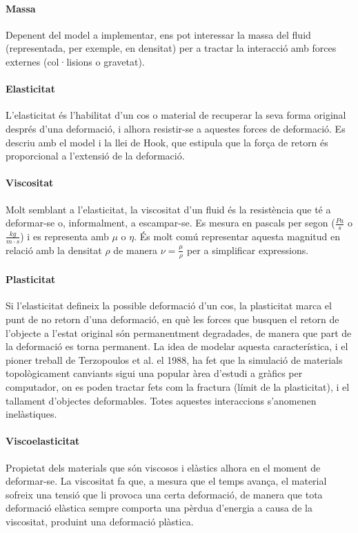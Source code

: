 \documentclass[a4paper]{article} %
\begin{document}
	\paragraph{\quad Massa} Depenent del model a implementar, ens pot interessar la massa del fluid (representada, per exemple, en densitat) per a tractar la interacció amb forces externes (col·lisions o gravetat).
	\paragraph{Elasticitat} L'elasticitat és l'habilitat d'un cos o material de recuperar la seva forma original després d'una deformació, i alhora resistir-se a aquestes forces de deformació. Es descriu amb el model i la llei de Hook, que estipula que la força de retorn és proporcional a l'extensió de la deformació.
	\paragraph{\quad Viscositat} Molt semblant a l'elasticitat, la viscositat d'un fluid és la resistència que té a deformar-se o, informalment, a escampar-se. Es mesura en pascals per segon ($\frac{Pa}{s}$ o $\frac{kg}{m \cdot s}$) i es representa amb $\mu$ o $\eta$. És molt comú representar aquesta magnitud en relació amb la densitat $\rho$ de manera $\nu = \frac{\mu}{\rho}$ per a simplificar expressions.
	\paragraph{\quad Plasticitat} Si l'elasticitat defineix la possible deformació d'un cos, la plasticitat marca el punt de no retorn d'una deformació, en què les forces que busquen el retorn de l'objecte a l'estat original són permanentment degradades, de manera que part de la deformació es torna permanent. La idea de modelar aquesta característica, i el pioner treball de Terzopoulos et al. \cite{Terzopoulos:1988:MID:378456.378522} el 1988, ha fet que la simulació de materials topològicament canviants sigui una popular àrea d'estudi a gràfics per computador, on es poden tractar fets com la fractura (límit de la plasticitat), i el tallament d'objectes deformables. Totes aquestes interaccions s'anomenen inelàstiques.
	\paragraph{\quad Viscoelasticitat} Propietat dels materials que són viscosos i elàstics alhora en el moment de deformar-se. La viscositat fa que, a mesura que el temps avança, el material sofreix una tensió que li provoca una certa deformació, de manera que tota deformació elàstica sempre comporta una pèrdua d'energia a causa de la viscositat, produint una deformació plàstica.
	
\end{document}

